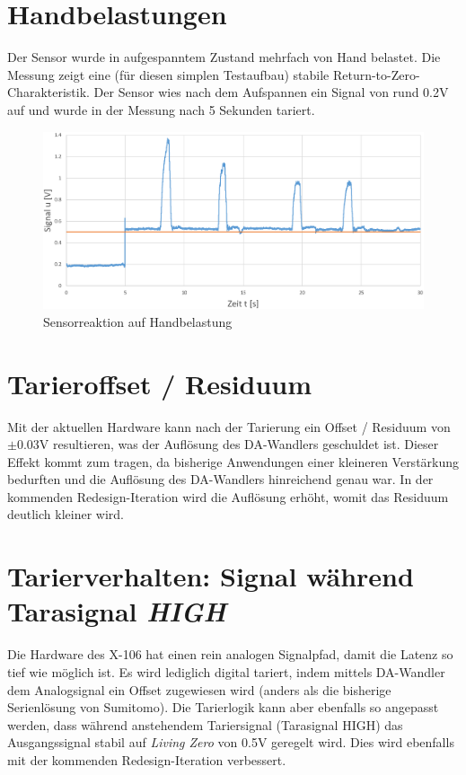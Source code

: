 \documentclass[12pt,a4paper]{article}
\begin{document}
	\section{Handbelastungen}
	Der Sensor wurde in aufgespanntem Zustand mehrfach von Hand belastet. Die Messung zeigt eine (für diesen simplen Testaufbau) stabile Return-to-Zero-Charakteristik. Der Sensor wies nach dem Aufspannen ein Signal von rund 0.2V auf und wurde in der Messung nach 5 Sekunden tariert.
	\begin{figure}[H]
		\centering
		\includegraphics[width=1\linewidth]{Bilder/warmup003}
		\caption{Sensorreaktion auf Handbelastung}
		\label{fig:warmup003}
	\end{figure}
	\section{Tarieroffset / Residuum}
	Mit der aktuellen Hardware kann nach der Tarierung ein Offset / Residuum von $\pm 0.03$V resultieren, was der Auflösung des DA-Wandlers geschuldet ist. Dieser Effekt kommt zum tragen, da bisherige Anwendungen einer kleineren Verstärkung bedurften und die Auflösung des DA-Wandlers hinreichend genau war. In der kommenden Redesign-Iteration wird die Auflösung erhöht, womit das Residuum deutlich kleiner wird.
	\section{Tarierverhalten: Signal während Tarasignal \textit{HIGH}}
	Die Hardware des X-106 hat einen rein analogen Signalpfad, damit die Latenz so tief wie möglich ist. Es wird lediglich digital tariert, indem mittels DA-Wandler dem Analogsignal ein Offset zugewiesen wird (anders als die bisherige Serienlösung von Sumitomo). Die Tarierlogik kann aber ebenfalls so angepasst werden, dass während anstehendem Tariersignal (Tarasignal HIGH)  das Ausgangssignal stabil auf \textit{Living Zero} von 0.5V geregelt wird. Dies wird ebenfalls mit der kommenden Redesign-Iteration verbessert.
\end{document}
